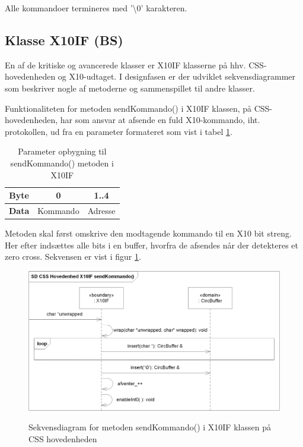 Alle kommandoer termineres med '\textbackslash 0' karakteren. 

\subsection{Klasse X10IF (BS)}
En af de kritiske og avancerede klasser er X10IF klasserne på hhv. CSS-hovedenheden og X10-udtaget. I designfasen er der udviklet sekvensdiagrammer som beskriver nogle af metoderne og sammenspillet til andre klasser.

Funktionaliteten for metoden sendKommando() i X10IF klassen, på CSS-hovedenheden, har som ansvar at afsende en fuld X10-kommando, iht. protokollen, ud fra en parameter formateret som vist i tabel \ref{table:X10_sendKommando_format}.

\begin{table}[h]
	\caption{Parameter opbygning til sendKommando() metoden i X10IF}
	\centering
	\begin{tabular}{|c|c|c|}
		\hline 
		\textbf{Byte} & 0 & 1..4 \\ \hline
		\textbf{Data} & Kommando & Adresse \\ 
		\hline 
	\end{tabular} 
	\label{table:X10_sendKommando_format}
\end{table}

Metoden skal først omskrive den modtagende kommando til en X10 bit streng. Her efter indsættes alle bits i en buffer, hvorfra de afsendes når der detekteres et zero cross. 
Sekvensen er vist i figur \ref{fig:X10_sendKommando_sd}.

\begin{figure}[!htb]
     {\includegraphics[width=\textwidth]{billeder/uml/CSS_X10IF_sendKommando_SD}}
     \caption{Sekvensdiagram for metoden sendKommando() i X10IF klassen på CSS hovedenheden}
     \label{fig:X10_sendKommando_sd}
\end{figure}

